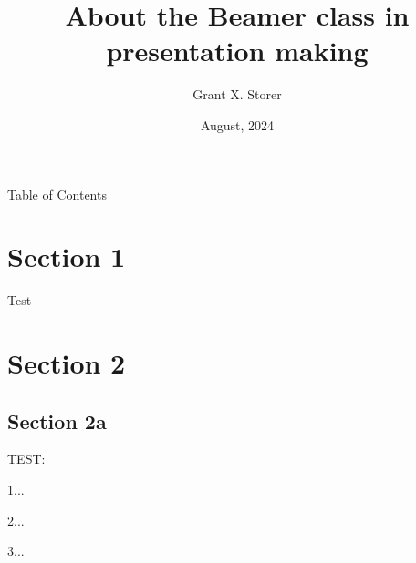\documentclass{beamer}
\title[About Beamer] %
    {About the Beamer class in presentation making}
\author{Grant X. Storer}
\institute{Inter-American Development Bank}
\date{August, 2024}
\begin{document}
    \frame{\titlepage}

\begin{frame}{Table of Contents}

    \section{Section 1}
        \tableofcontents

\end{frame}

\begin{frame}{Test}

    \section{Section 2}
    \subsection{Section 2a}

TEST:

1...

2...

3...
    
\end{frame}
\end{document}
